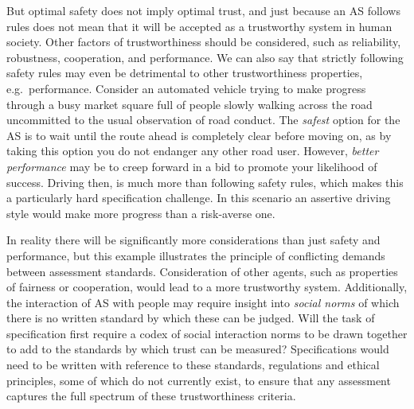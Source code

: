 \documentclass[sigconf,nonacm]{acmart}%
\begin{document}
But optimal safety does not imply optimal trust, and just because an AS follows rules does not mean that it will be accepted as a trustworthy system in human society. Other factors of trustworthiness should be considered, such as reliability, robustness, cooperation, and performance. 
%
We can also say that strictly following safety rules may even be detrimental to other trustworthiness properties, e.g.\ performance. 
%
Consider an automated vehicle trying to make progress through a busy market square full of people slowly walking across the road uncommitted to the usual observation of road conduct. 
%
The \emph{safest} option for the AS is to wait until the route ahead is completely clear before moving on, as by taking this option you do not endanger any other road user. However, \emph{better performance} may be to creep forward in a bid to promote your likelihood of success.
%
Driving then, is much more than following safety rules, which makes this a particularly hard specification challenge. In this scenario an assertive driving style would make more progress than a risk-averse one. 
%


In reality there will be significantly more considerations than just safety and performance, but this example illustrates the principle of conflicting demands between assessment standards. 
%
Consideration of other agents, such as properties of fairness or cooperation, would lead to a more trustworthy system. 
%
Additionally, the interaction of AS with people may require insight into \emph{social norms} of which there is no written standard by which these can be judged. Will the task of specification first require a codex of social interaction norms to be drawn together to add to the standards by which trust can be measured? 
%
Specifications would need to be written with reference to these standards, regulations and ethical principles, some of which do not currently exist, to ensure that any assessment captures the full spectrum of these trustworthiness criteria. 
\end{document}
